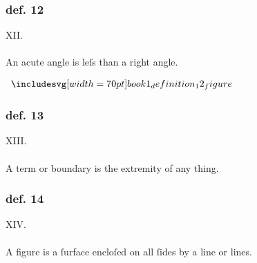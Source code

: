 \hfill

\begin{minipage}{0.67\textwidth}
    \subsubsection{def. 12}
    \begin{center}
        XII.\label{book1def12}\\
        \hfill\\
        An acute angle is leſs than a right angle.
    \end{center}
\end{minipage}%
\begin{minipage}{0.33\textwidth}
    \begin{center}
        $\img[0][0][70]{book1_definition_12_figure}$
    \end{center}
\end{minipage}

\hfill

\begin{minipage}{0.67\textwidth}
    \subsubsection{def. 13}
    \begin{center}
        XIII.\label{book1def13}\\
        \hfill\\
        A term or boundary is the extremity of any thing.
    \end{center}
    \subsubsection{def. 14}
    \begin{center}
        XIV.\label{book1def14}\\
        \hfill\\
        A figure is a ſurface encloſed on all ſides by a line or lines.
    \end{center}
\end{minipage}

\pagebreak

